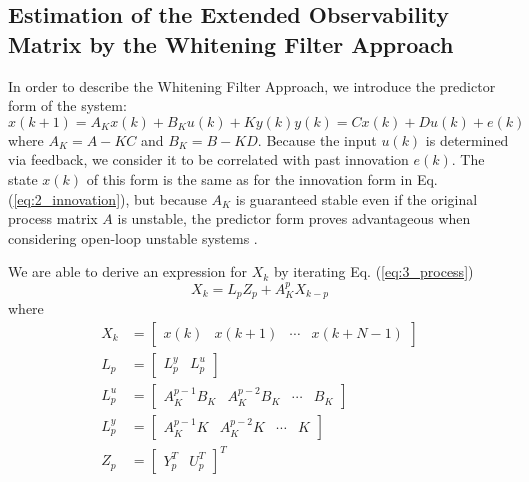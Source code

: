 \subsection{Estimation of the Extended Observability Matrix by the Whitening Filter Approach}
In order to describe the Whitening Filter Approach, we introduce the predictor form of the system:
\begin{subequations}\label{eq:3_process}
\begin{equation}x(k+1) = A_Kx(k) + B_Ku(k) + Ky(k)\end{equation}
\begin{equation}y(k) = Cx(k) + Du(k) + e(k)\end{equation}
\end{subequations}
where $A_K = A-KC$ and $B_K = B-KD$. Because the input $u(k)$ is determined via feedback, we consider it to be correlated with past innovation $e(k)$. The state $x(k)$ of this form is the same as for the innovation form in Eq. (\ref{eq:2_innovation}), but because $A_K$ is guaranteed stable even if the original process matrix $A$ is unstable, the predictor form proves advantageous when considering open-loop unstable systems \cite{qin2006overview}.

We are able to derive an expression for $X_k$ by iterating Eq. (\ref{eq:3_process})
\begin{equation}\label{eq:3_state}
X_k = L_p Z_p + A_K^p X_{k-p}
\end{equation}
where
\begin{align*}
X_k &= \begin{bmatrix} x(k) & x(k+1) & \cdots & x(k+N-1)\end{bmatrix}\\
L_p &= \begin{bmatrix}L_p^y & L_p^u\end{bmatrix}\\
L_p^u &= \begin{bmatrix}A_K^{p-1}B_K & A_K^{p-2}B_K & \cdots & B_K\end{bmatrix}\\
L_p^y &= \begin{bmatrix}A_K^{p-1}K & A_K^{p-2}K & \cdots & K\end{bmatrix}\\
Z_p &= \begin{bmatrix} Y_p^T & U_p^T\end{bmatrix}^T
\end{align*}


